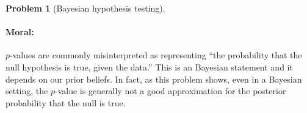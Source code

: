 \documentclass{article}
\theoremstyle{definition}
\newtheorem{problem}{Problem}
\begin{document}
\begin{problem}[Bayesian hypothesis testing]
\begin{enumerate}[(a)]
\end{enumerate}


\paragraph{Moral:} $p$-values are commonly misinterpreted as representing ``the probability that the null hypothesis is true, given the data.'' This is an Bayesian statement and it depends on our prior beliefs. In fact, as this problem shows, even in a Bayesian setting, the $p$-value is generally not a good approximation for the posterior probability that the null is true.
\end{problem}



\end{document}
